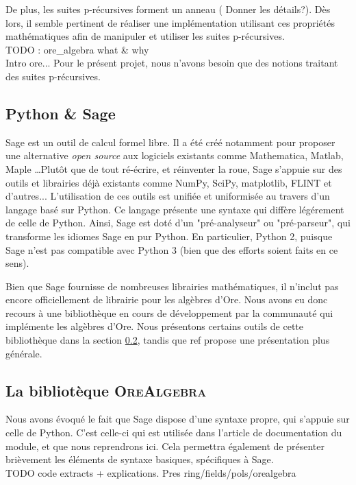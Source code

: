 \documentclass[12pt]{article}
\begin{document}
        De plus, les suites p-récursives forment un anneau ({\color{red} Donner les détails?}).
        Dès lors, il semble pertinent
        de réaliser une implémentation utilisant ces propriétés mathématiques afin de
        manipuler et utiliser les suites p-récursives.\\
        {\color{red} TODO : ore\_algebra what \& why\\ Intro ore...} Pour le présent projet,
        nous n'avons besoin que des notions traitant des suites p-récursives.
    \subsection{Python \& Sage}
        \label{sec:sage}
        \par Sage est un outil de calcul formel libre.
        Il a été créé notamment pour proposer
        une alternative \textit{open source} aux logiciels existants comme Mathematica,
        Matlab, Maple \ldots Plutôt que de tout ré-écrire, et réinventer la roue,
        Sage s'appuie sur des outils
        et librairies déjà existants comme NumPy, SciPy, matplotlib, FLINT et d'autres...
        L'utilisation de ces outils est unifiée et uniformisée au travers d'un langage
        basé sur Python. Ce langage présente une syntaxe qui diffère légérement de celle
        de Python. Ainsi, Sage est doté d'un "pré-analyseur" ou "pré-parseur",
        qui transforme les idiomes Sage en pur Python.
        En particulier, Python 2, puisque Sage n'est pas compatible avec Python 3
        (bien que des efforts soient faits en ce sens).
        \par Bien que Sage fournisse de nombreuses librairies mathématiques,
        il n'inclut pas encore officiellement de librairie pour les algèbres d'Ore.
        Nous avons eu donc recours à une bibliothèque en cours de développement par
        la communauté qui implémente les algèbres d'Ore. Nous présentons certains outils
        de cette bibliothèque
        dans la section \ref{sec:libore}, tandis que {\color{red} ref} propose une
        présentation plus générale.
    \subsection{La bibliotèque \textsc{OreAlgebra}}
        \label{sec:libore}
        \par Nous avons évoqué le fait que Sage dispose d'une syntaxe propre, qui s'appuie
        sur celle de Python.
        C'est celle-ci qui est utilisée dans l'article de documentation du module, et que nous
        reprendrons ici. Cela permettra également de présenter brièvement les éléments de syntaxe
        basiques, spécifiques à Sage.\\
        {\color{red} TODO code extracts + explications. Pres ring/fields/pols/orealgebra}
\end{document}
